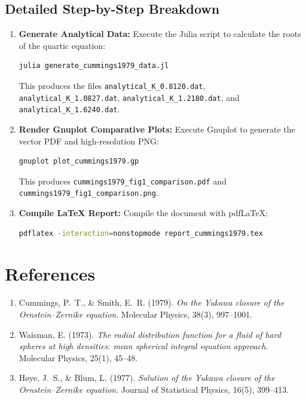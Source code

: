 \documentclass[11pt,a4paper]{article}
\begin{document}
\subsection{Detailed Step-by-Step Breakdown}
\begin{enumerate}
    \item \textbf{Generate Analytical Data:} Execute the Julia script to calculate the roots of the quartic equation:
    \begin{lstlisting}[language=bash]
julia generate_cummings1979_data.jl
    \end{lstlisting}
    This produces the files \texttt{analytical\_K\_0.8120.dat}, \texttt{analytical\_K\_1.0827.dat}, \texttt{analytical\_K\_1.2180.dat}, and \texttt{analytical\_K\_1.6240.dat}.

    \item \textbf{Render Gnuplot Comparative Plots:} Execute Gnuplot to generate the vector PDF and high-resolution PNG:
    \begin{lstlisting}[language=bash]
gnuplot plot_cummings1979.gp
    \end{lstlisting}
    This produces \texttt{cummings1979\_fig1\_comparison.pdf} and \texttt{cummings1979\_fig1\_comparison.png}.

    \item \textbf{Compile LaTeX Report:} Compile the document with pdf\LaTeX:
    \begin{lstlisting}[language=bash]
pdflatex -interaction=nonstopmode report_cummings1979.tex
    \end{lstlisting}
\end{enumerate}

\section{References}
\begin{enumerate}
    \item Cummings, P.~T., \& Smith, E.~R. (1979). \textit{On the Yukawa closure of the Ornstein--Zernike equation}. Molecular Physics, 38(3), 997--1001.
    \item Waisman, E. (1973). \textit{The radial distribution function for a fluid of hard spheres at high densities: mean spherical integral equation approach}. Molecular Physics, 25(1), 45--48.
    \item H{\o}ye, J.~S., \& Blum, L. (1977). \textit{Solution of the Yukawa closure of the Ornstein--Zernike equation}. Journal of Statistical Physics, 16(5), 399--413.
\end{enumerate}
\end{document}
